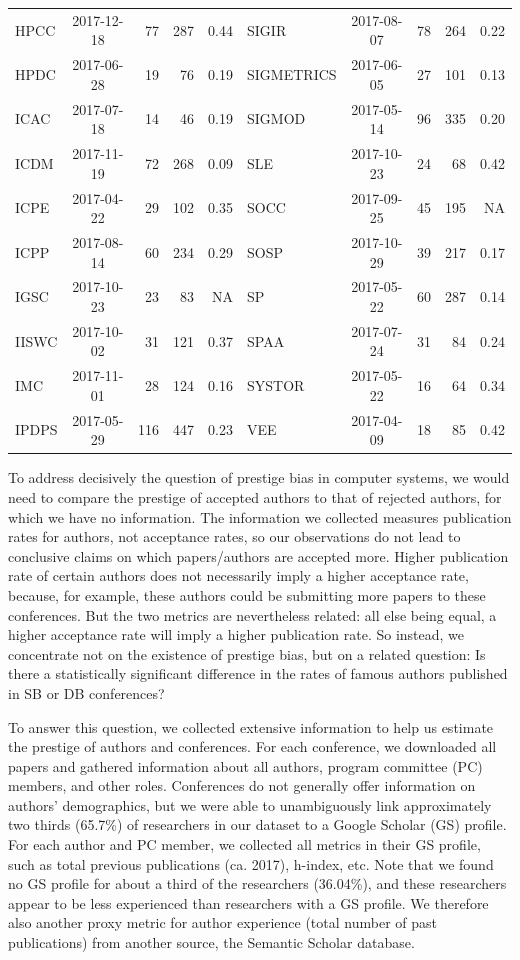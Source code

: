 \documentclass[12pt]{article}
\begin{document}
\begin{table}
\begin{tabular}[t]{|lcrrr||lcrrr|}
HPCC & 2017-12-18 & 77 & 287 & 0.44 & SIGIR & 2017-08-07 & 78 & 264 & 0.22\\
HPDC & 2017-06-28 & 19 & 76 & 0.19 & SIGMETRICS & 2017-06-05 & 27 & 101 & 0.13\\
ICAC & 2017-07-18 & 14 & 46 & 0.19 & SIGMOD & 2017-05-14 & 96 & 335 & 0.20\\
ICDM & 2017-11-19 & 72 & 268 & 0.09 & SLE & 2017-10-23 & 24 & 68 & 0.42\\
ICPE & 2017-04-22 & 29 & 102 & 0.35 & SOCC & 2017-09-25 & 45 & 195 & NA\\
ICPP & 2017-08-14 & 60 & 234 & 0.29 & SOSP & 2017-10-29 & 39 & 217 & 0.17\\
IGSC & 2017-10-23 & 23 & 83 & NA & SP & 2017-05-22 & 60 & 287 & 0.14\\
IISWC & 2017-10-02 & 31 & 121 & 0.37 & SPAA & 2017-07-24 & 31 & 84 & 0.24\\
IMC & 2017-11-01 & 28 & 124 & 0.16 & SYSTOR & 2017-05-22 & 16 & 64 & 0.34\\
IPDPS & 2017-05-29 & 116 & 447 & 0.23 & VEE & 2017-04-09 & 18 & 85 & 0.42\\
\bottomrule
\end{tabular}
\end{table}

To address decisively the question of prestige bias in computer systems, we would need to compare the prestige of accepted authors to that of rejected authors, for which we have no information.
The information we collected measures publication rates for authors, not acceptance rates, so our observations do not lead to conclusive claims on which papers/authors are accepted more.
Higher publication rate of certain authors does not necessarily imply a higher acceptance rate, because, for example, these authors could be submitting more papers to these conferences.
But the two metrics are nevertheless related: all else being equal, a higher acceptance rate will imply a higher publication rate.
So instead, we concentrate not on the existence of prestige bias, but on a related question:
Is there a statistically significant difference in the rates of famous authors published in SB or DB conferences?

To answer this question, we collected extensive information to help us estimate the prestige of authors and conferences.
For each conference, we downloaded all papers and gathered information about all authors, program committee (PC) members, and other roles.
Conferences do not generally offer information on authors' demographics, but we were able to unambiguously link approximately two thirds (65.7\%) of
researchers in our dataset to a Google Scholar (GS) profile.
For each author and PC member, we collected all metrics in their GS profile, such as total previous publications (ca. 2017), h-index, etc.
Note that we found no GS profile for about a third of the researchers
(36.04\%),
and these researchers appear to be less experienced than researchers with a GS profile.
We therefore also another proxy metric for author experience (total number of past publications) from another source, the Semantic Scholar database.
\end{document}
